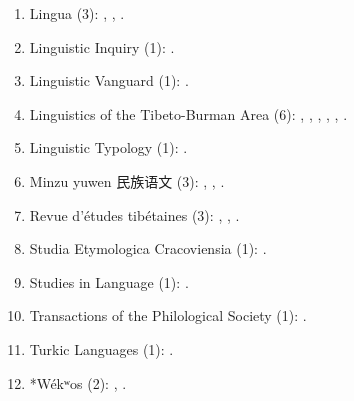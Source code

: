 \documentclass[oneside,a4paper,11pt]{article}
\newcommand{\zh}[1]{{\cn #1}}
\begin{document}
\begin{enumerate}
 \item Lingua (3):  \citet{jacques11lingua}, \citet{jacques12incorp}, \citet{jacques14antipassive}.
 \item Linguistic Inquiry (1): \citet{antonov14need}.
 \item Linguistic Vanguard (1): \citet{jacques16th}.
 \item Linguistics of the Tibeto-Burman Area (6): \citet{jacques09wazur}, \citet{jacques13tropative}, \citet{jacques14linking}, \citet{jacques15spontaneous}, \citet{jacques16si}, \citet{jacques16complementation}.
 \item Linguistic Typology (1): \citet{jacques13harmonization}.
 \item Minzu yuwen \zh{民族语文} (3): \citet{jacques03s.houzhui}, \citet{jacques04redupl}, \citet{jacques08weiyu}.
 \item Revue d'études tibétaines (3): \citet{jacques07naksatram},  \citet{jacques08debther},   \citet{jacques10ndr}.
 \item Studia Etymologica Cracoviensia (1):  \citet{jacques13vama}.
  \item Studies in Language (1): \citet{jacques14auditory}.
  \item Transactions of the Philological Society (1):  \citet{jacques12internal}.
  \item Turkic Languages (1): \citet{antonov12kumush}.
\item *Wékʷos (2): \citet{jacques14honey}, \citet{jacques16camara}.
 \end{enumerate} 
 
\end{document}

